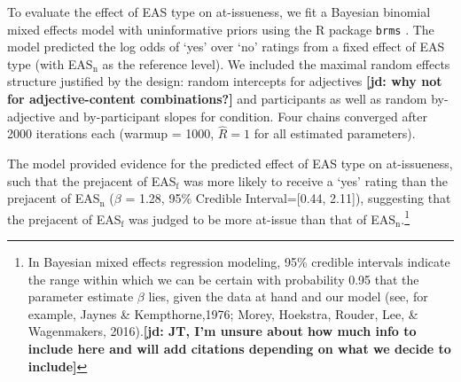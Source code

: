 \documentclass[11pt,fleqn]{article}
\newcommand{\6}{\mbox{$[\hspace*{-.6mm}[$}}
\newcommand{\9}{\mbox{$]\hspace*{-.6mm}]$}}
\newcommand{\jd}[1]{\textbf{\color{green}[jd: #1]}}
\begin{document}
To evaluate the effect of EAS type on at-issueness, we fit a Bayesian binomial mixed effects model with uninformative  priors using the R package \verb|brms| \citep{buerkner2017}. The model predicted the log odds of `yes' over `no' ratings  from a fixed effect of  EAS type (with EAS$_{\mbox{n}}$ as the reference level). We included the maximal random effects structure justified by the design: random intercepts for adjectives \jd{why not for adjective-content combinations?} and participants as well as random by-adjective and by-participant slopes for condition. Four chains converged after 2000 iterations each (warmup = 1000, \(\hat{R}=1\) for all estimated parameters).

The model provided evidence for the predicted effect of EAS type on at-issueness, such that the prejacent of EAS$_{\mbox{f}}$ was more likely to receive a `yes' rating than the prejacent of EAS$_{\mbox{n}}$  ($\beta$ = 1.28, 95\% Credible Interval={[}0.44, 2.11{]}), suggesting that the prejacent of EAS$_{\mbox{f}}$ was judged to be more at-issue than that of EAS$_{\mbox{n}}$.\footnote{In Bayesian mixed effects regression modeling, 95\% credible intervals indicate the range within which we can be certain with probability 0.95 that the parameter estimate $\beta$  lies, given the data at hand and our model (see, for example, Jaynes \& Kempthorne,1976;  Morey, Hoekstra, Rouder, Lee, \& Wagenmakers, 2016).\jd{JT, I'm unsure about how much info to include here and will add citations depending on what we decide to include}} 
\end{document}
